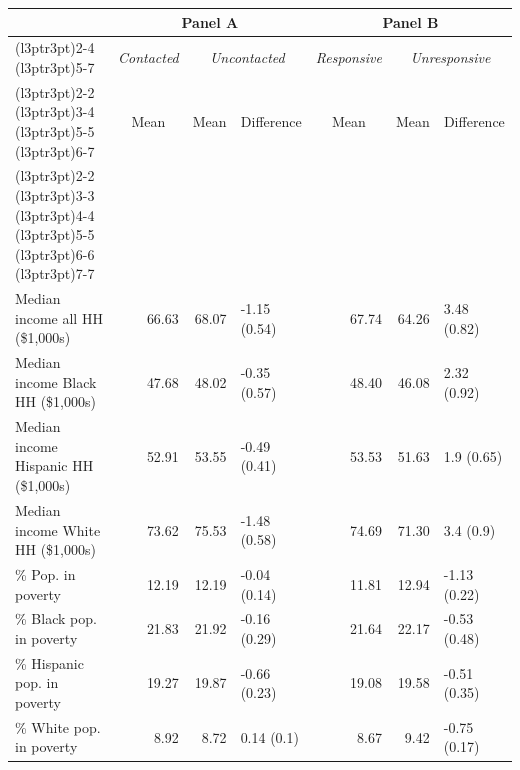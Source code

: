 \begin{table}
\centering
\begin{tabular}[t]{lrrlrrl}
\toprule
\multicolumn{1}{c}{\textbf{}} & \multicolumn{3}{c}{\textbf{Panel A}} & \multicolumn{3}{c}{\textbf{Panel B}} \\
\cmidrule(l{3pt}r{3pt}){2-4} \cmidrule(l{3pt}r{3pt}){5-7}
\multicolumn{1}{c}{\em{}} & \multicolumn{1}{c}{\em{Contacted}} & \multicolumn{2}{c}{\em{Uncontacted}} & \multicolumn{1}{c}{\em{Responsive}} & \multicolumn{2}{c}{\em{Unresponsive}} \\
\cmidrule(l{3pt}r{3pt}){2-2} \cmidrule(l{3pt}r{3pt}){3-4} \cmidrule(l{3pt}r{3pt}){5-5} \cmidrule(l{3pt}r{3pt}){6-7}
\multicolumn{1}{c}{} & \multicolumn{1}{c}{Mean} & \multicolumn{1}{c}{Mean} & \multicolumn{1}{c}{Difference} & \multicolumn{1}{c}{Mean} & \multicolumn{1}{c}{Mean} & \multicolumn{1}{c}{Difference} \\
\cmidrule(l{3pt}r{3pt}){2-2} \cmidrule(l{3pt}r{3pt}){3-3} \cmidrule(l{3pt}r{3pt}){4-4} \cmidrule(l{3pt}r{3pt}){5-5} \cmidrule(l{3pt}r{3pt}){6-6} \cmidrule(l{3pt}r{3pt}){7-7}
\addlinespace[0.3em]
\multicolumn{7}{l}{\textbf{Income (county-level)}}\\
\hspace{1em}Median income all HH (\$1,000s) & 66.63 & 68.07 & -1.15 (0.54) & 67.74 & 64.26 & 3.48 (0.82)\\
\hspace{1em}Median income Black HH (\$1,000s) & 47.68 & 48.02 & -0.35 (0.57) & 48.40 & 46.08 & 2.32 (0.92)\\
\hspace{1em}Median income Hispanic HH (\$1,000s) & 52.91 & 53.55 & -0.49 (0.41) & 53.53 & 51.63 & 1.9 (0.65)\\
\hspace{1em}Median income White HH (\$1,000s) & 73.62 & 75.53 & -1.48 (0.58) & 74.69 & 71.30 & 3.4 (0.9)\\
\hspace{1em}\% Pop. in poverty & 12.19 & 12.19 & -0.04 (0.14) & 11.81 & 12.94 & -1.13 (0.22)\\
\hspace{1em}\% Black pop. in poverty & 21.83 & 21.92 & -0.16 (0.29) & 21.64 & 22.17 & -0.53 (0.48)\\
\hspace{1em}\% Hispanic pop. in poverty & 19.27 & 19.87 & -0.66 (0.23) & 19.08 & 19.58 & -0.51 (0.35)\\
\hspace{1em}\% White pop. in poverty & 8.92 & 8.72 & 0.14 (0.1) & 8.67 & 9.42 & -0.75 (0.17)\\

\end{tabular}
\end{table}
